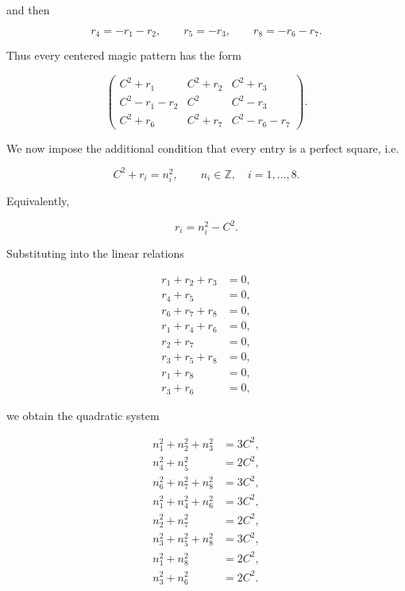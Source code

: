 \documentclass[12pt]{article}
\begin{document}
and then


\[
r_{4}=-r_{1}-r_{2},\qquad
r_{5}=-r_{3},\qquad
r_{8}=-r_{6}-r_{7}.
\]



Thus every centered magic pattern has the form


\[
\begin{pmatrix}
C^{2}+r_{1} & C^{2}+r_{2} & C^{2}+r_{3} \\
C^{2}-r_{1}-r_{2} & C^{2} & C^{2}-r_{3} \\
C^{2}+r_{6} & C^{2}+r_{7} & C^{2}-r_{6}-r_{7}
\end{pmatrix}.
\]



We now impose the additional condition that every entry is a perfect square, i.e.


\[
C^{2}+r_i = n_i^{2}, \qquad n_i\in\mathbb{Z},\quad i=1,\dots,8.
\]


Equivalently,


\[
r_i = n_i^{2}-C^{2}.
\]



Substituting into the linear relations


\[
\begin{aligned}
r_{1}+r_{2}+r_{3} &= 0,\\
r_{4}+r_{5} &= 0,\\
r_{6}+r_{7}+r_{8} &= 0,\\
r_{1}+r_{4}+r_{6} &= 0,\\
r_{2}+r_{7} &= 0,\\
r_{3}+r_{5}+r_{8} &= 0,\\
r_{1}+r_{8} &= 0,\\
r_{3}+r_{6} &= 0,
\end{aligned}
\]


we obtain the quadratic system


\[
\begin{aligned}
n_{1}^{2}+n_{2}^{2}+n_{3}^{2} &= 3C^{2},\\
n_{4}^{2}+n_{5}^{2} &= 2C^{2},\\
n_{6}^{2}+n_{7}^{2}+n_{8}^{2} &= 3C^{2},\\
n_{1}^{2}+n_{4}^{2}+n_{6}^{2} &= 3C^{2},\\
n_{2}^{2}+n_{7}^{2} &= 2C^{2},\\
n_{3}^{2}+n_{5}^{2}+n_{8}^{2} &= 3C^{2},\\
n_{1}^{2}+n_{8}^{2} &= 2C^{2},\\
n_{3}^{2}+n_{6}^{2} &= 2C^{2}.
\end{aligned}
\]
\end{document}
